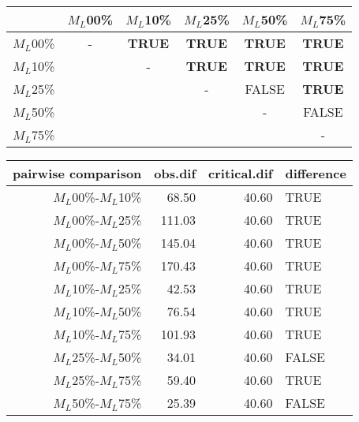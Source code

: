 \begin{tabular}{c|ccccc}
    \hline
              & $M_L$00\% & $M_L$10\% & $M_L$25\% & $M_L$50\% & $M_L$75\% \\
    \hline
    $M_L$00\% & - & \textbf{TRUE}  & \textbf{TRUE} & \textbf{TRUE} & \textbf{TRUE}\\
    $M_L$10\% & & - & \textbf{TRUE}  & \textbf{TRUE} & \textbf{TRUE} \\
    $M_L$25\% & & & - & FALSE  & \textbf{TRUE} \\
    $M_L$50\% & & & & - & FALSE  \\
    $M_L$75\% & & & & & - \\
    \hline
\end{tabular}
\centering
\begin{tabular}{rrrl}
 pairwise comparison & obs.dif & critical.dif & difference \\ 
  \hline
  $M_L$00\%-$M_L$10\% & 68.50 & 40.60 & TRUE \\ 
  $M_L$00\%-$M_L$25\% & 111.03 & 40.60 & TRUE \\ 
  $M_L$00\%-$M_L$50\% & 145.04 & 40.60 & TRUE \\ 
  $M_L$00\%-$M_L$75\% & 170.43 & 40.60 & TRUE \\
  $M_L$10\%-$M_L$25\% & 42.53 & 40.60 & TRUE \\
  $M_L$10\%-$M_L$50\% & 76.54 & 40.60 & TRUE \\
  $M_L$10\%-$M_L$75\% & 101.93 & 40.60 & TRUE \\ 
  $M_L$25\%-$M_L$50\% & 34.01 & 40.60 & FALSE \\ 
  $M_L$25\%-$M_L$75\% & 59.40 & 40.60 & TRUE \\ 
  $M_L$50\%-$M_L$75\% & 25.39 & 40.60 & FALSE \\ 
   \hline
\end{tabular}